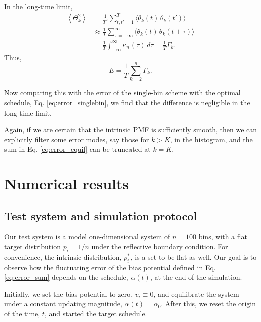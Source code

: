 \documentclass[reprint, floatfix]{revtex4-1}
\begin{document}
In the long-time limit,
\begin{align*}
\left\langle
  \Theta_k^2
\right\rangle
&=
\frac{1}{T^2}
\sum_{ t, t' = 1 }^T
\langle \theta_k(t) \, \theta_k(t') \rangle
\\
&\approx
\frac{1}{T}
\sum_{ \tau = -\infty }^{ \infty }
\langle \theta_k(t) \, \theta_k(t + \tau) \rangle
\\
&=
\frac{1}{T}
\int_{-\infty}^\infty
\kappa_n(\tau) \, d\tau
=
\frac{1}{T}
\Gamma_k.
\end{align*}
%
Thus,
\begin{equation}
  E
  =
  \frac{ 1 } { T }
  \sum_{ k = 2 }^n \Gamma_k
  .
\label{eq:error_equil}
\end{equation}

Now comparing this with the error of the single-bin scheme
with the optimal schedule,
Eq. \eqref{eq:error_singlebin},
we find that the difference is negligible
in the long time limit.

Again, if we are certain that
the intrinsic PMF is sufficiently smooth,
then we can explicitly filter some error modes,
say those for $k > K$,
in the histogram, and the sum in
Eq. \eqref{eq:error_equil}
can be truncated at $k = K$.





\section{\label{sec:results}
Numerical results}



\subsection{Test system and simulation protocol}


Our test system is
a model one-dimensional system
of $n = 100$ bins,
with a flat target distribution
$p_i = 1/n$
under the reflective boundary condition.
%
For convenience,
the intrinsic distribution, $p^*_i$,
is a set to be flat as well.
%
Our goal is to observe how the fluctuating error
of the bias potential defined in Eq. \eqref{eq:error_sum}
depends on the schedule, $\alpha(t)$,
at the end of the simulation.



Initially,
we set the bias potential to zero,
$v_i \equiv 0$,
%
and equilibrate the system under
a constant updating magnitude,
$\alpha(t) = \alpha_0$.
%
After this,
we reset the origin of the time, $t$,
and started the target schedule.
\end{document}
